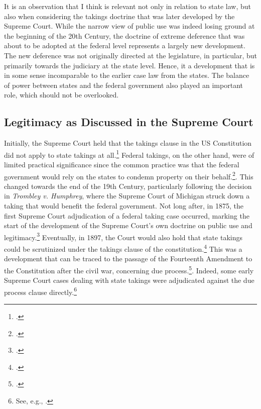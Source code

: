 It is an observation that I think is relevant not only in relation to state law, but also when considering the takings doctrine that was later developed by the Supreme Court. While the narrow view of public use was indeed losing ground at the beginning of the 20th Century, the doctrine of extreme deference that was about to be adopted at the federal level represents a largely new development. The new deference was not originally directed at the legislature, in particular, but primarily towards the judiciary at the state level. Hence, it  a development that is in some sense incomparable to the earlier case law from the states. The balance of power between states and the federal government also played an important role, which should not be overlooked.

\subsection{Legitimacy as Discussed in the Supreme Court}\label{subsec:US}

Initially, the Supreme Court held that the takings clause in the US Constitution did not apply to state takings at all.\footcite{barron33} Federal takings, on the other hand, were of limited practical significance since the common practice was that the federal government would rely on the states to condemn property on their behalf.\footcite[30]{meidinger80}. This changed towards the end of the 19th Century, particularly following the decision in {\it Trombley v. Humphrey}, where the Supreme Court of Michigan struck down a taking that would benefit the federal government.\cite{trombley71} Not long after, in 1875, the first Supreme Court adjudication of a federal taking case occurred, marking the start of the development of the Supreme Court's own doctrine on public use and legitimacy.\footcite{kohl75} Eventually, in 1897, the Court would also hold that state takings could be scrutinized under the takings clause of the constitution.\footcite{chicago97} This was a development that can be traced to the passage of the Fourteenth Amendment to the Constitution after the civil war, concerning due process.\footcite{johnson11}. Indeed, some early Supreme Court cases dealing with state takings were adjudicated against the due process clause directly.\footnote{See, e.g., \cite{head85}.}

